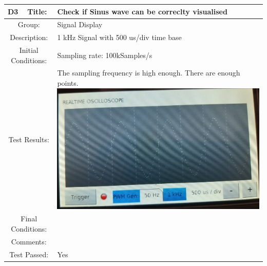 \documentclass[12pt]{article}
\begin{document}
		\begin{table}[H]
	\begin{center}
		\begin{tabular}{| m{2cm}|m{2cm}|m{12cm}|}
			\hline 
			\bf D3&\bf Title:&\bf Check if Sinus wave can be correclty visualised\\ 
			\hline 
			\multicolumn{2}{|c|}{Group:}&Signal Display\\ 
			\hline 
			\multicolumn{2}{|c|}{Description:}&1 kHz Signal with 500 us/div time base\\ 
			\hline 
			\multicolumn{2}{|c|}{Initial Conditions:}&Sampling rate: 100kSamples/s\\ 
			\hline 
			\multicolumn{2}{|c|}{Test Results:}&The sampling frequency is high enough. There are enough points.
			\includegraphics[scale=0.08]{Ressources/sinus_500us}\\ 
			\hline 
			\multicolumn{2}{|c|}{Final Conditions:}&\\ 
			\hline 
			\multicolumn{2}{|c|}{Comments:}&\\ 
			\hline 
			\multicolumn{2}{|c|}{Test Passed:}&Yes \\ 
			\hline 
		\end{tabular} 
	\end{center}
\end{table}	
\end{document}

